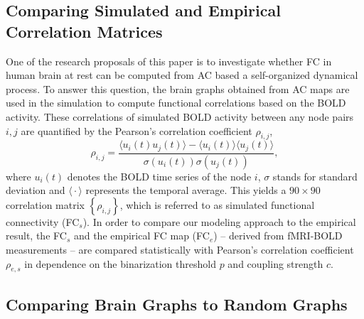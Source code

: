 \documentclass[fleqn,10pt]{wlpeerj}
\begin{document}
\subsection*{Comparing Simulated and Empirical Correlation Matrices}       
One of the research proposals of this paper is to investigate whether FC in human brain at
rest can be computed from AC based a self-organized dynamical process. To answer this
question, the brain graphs obtained from AC maps are used in the simulation to compute functional correlations based
on the BOLD activity. These correlations of simulated BOLD activity between any node pairs $i,j$ are quantified by
the Pearson's correlation coefficient $\rho_{i,j}$, 
\begin{equation}
\rho_{i,j} = \dfrac{\big \langle u_i(t) u_{j}(t) \big \rangle - \big \langle u_{i}(t) \big \rangle  \big \langle
u_{j}(t) \big \rangle}{ \sigma (u_i(t)) \sigma (u_j(t))},
\end{equation}
where $u_i(t)$ denotes the BOLD time series of the node $i$,  $\sigma$ stands for standard deviation and
$\big \langle \cdot \big \rangle$ represents the temporal average. 
This yields a $90\times 90$ correlation matrix  $\left\{\rho_{i,j}\right\}$, which is referred to as simulated
functional connectivity (FC$_s$).
In order to compare our modeling approach to the empirical result, the FC$_s$ and the empirical FC map (FC$_e$)
-- derived from fMRI-BOLD measurements -- are compared statistically with Pearson's correlation coefficient $\rho_{e,s}$
in dependence on the binarization threshold $p$ and coupling strength $c$.


\subsection*{Comparing Brain Graphs to Random Graphs}
\end{document}
